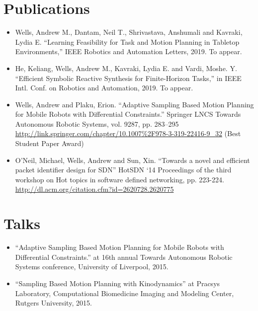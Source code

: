 \documentclass[11pt,a4paper,sans]{moderncv}        %
\begin{document}
\section{Publications}

\vspace{6pt}

\begin{itemize}

\item{Wells, Andrew M., Dantam, Neil T., Shrivastava, Anshumali and Kavraki, Lydia E.  “Learning Feasibility for Task and Motion Planning in Tabletop Environments,” IEEE Robotics and Automation Letters, 2019. To appear.}

\item{He, Keliang, Wells, Andrew M., Kavraki, Lydia E. and Vardi, Moshe. Y.  “Efficient Symbolic Reactive Synthesis for Finite-Horizon Tasks,” in IEEE Intl. Conf. on Robotics and Automation, 2019. To appear.}

\item{Wells, Andrew and Plaku, Erion.  “Adaptive Sampling Based Motion Planning for Mobile Robots with Differential Constraints.” Springer LNCS Towards Autonomous Robotic Systems, vol. 9287, pp. 283–295 \url{http://link.springer.com/chapter/10.1007%2F978-3-319-22416-9_32} (Best Student Paper Award)}

\item{O’Neil, Michael, Wells, Andrew and Sun, Xin. “Towards a novel and efficient packet identifier design for SDN” HotSDN ‘14 Proceedings of the third workshop on Hot topics in software defined networking, pp. 223-224. \url{http://dl.acm.org/citation.cfm?id=2620728.2620775}}

\end{itemize}

\section{Talks}

\vspace{6pt}
 
\begin{itemize}

\item{“Adaptive Sampling Based Motion Planning for Mobile Robots with Differential Constraints.” at 16th annual Towards Autonomous Robotic Systems conference, University of Liverpool, 2015.}

\vspace{6pt}

\item{“Sampling Based Motion Planning with Kinodynamics” at Pracsys Laboratory, Computational Biomedicine Imaging and Modeling Center, Rutgers University, 2015.}

\end{itemize}
\end{document}
